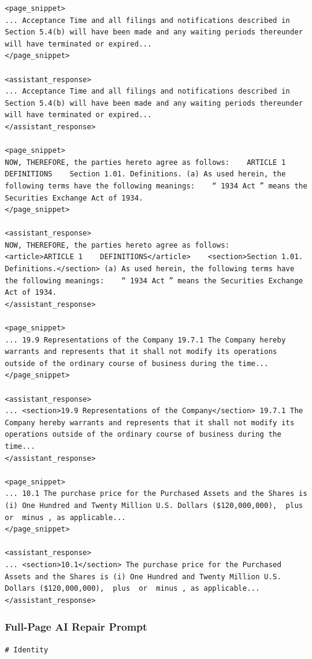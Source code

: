 \documentclass[12pt]{article}
\begin{document}
{\begin{appendices}
\begin{verbatim}
<page_snippet>
... Acceptance Time and all filings and notifications described in Section 5.4(b) will have been made and any waiting periods thereunder will have terminated or expired...
</page_snippet>

<assistant_response>
... Acceptance Time and all filings and notifications described in Section 5.4(b) will have been made and any waiting periods thereunder will have terminated or expired...
</assistant_response>

<page_snippet>
NOW, THEREFORE, the parties hereto agree as follows:    ARTICLE 1    DEFINITIONS    Section 1.01. Definitions. (a) As used herein, the following terms have the following meanings:    “ 1934 Act ” means the Securities Exchange Act of 1934.
</page_snippet>

<assistant_response>
NOW, THEREFORE, the parties hereto agree as follows:    <article>ARTICLE 1    DEFINITIONS</article>    <section>Section 1.01. Definitions.</section> (a) As used herein, the following terms have the following meanings:    “ 1934 Act ” means the Securities Exchange Act of 1934.
</assistant_response>

<page_snippet>
... 19.9 Representations of the Company 19.7.1 The Company hereby warrants and represents that it shall not modify its operations outside of the ordinary course of business during the time...
</page_snippet>

<assistant_response>
... <section>19.9 Representations of the Company</section> 19.7.1 The Company hereby warrants and represents that it shall not modify its operations outside of the ordinary course of business during the time...
</assistant_response>

<page_snippet>
... 10.1 The purchase price for the Purchased Assets and the Shares is (i) One Hundred and Twenty Million U.S. Dollars ($120,000,000),  plus  or  minus , as applicable...
</page_snippet>

<assistant_response>
... <section>10.1</section> The purchase price for the Purchased Assets and the Shares is (i) One Hundred and Twenty Million U.S. Dollars ($120,000,000),  plus  or  minus , as applicable...
</assistant_response>
\end{verbatim}
\endgroup

\subsubsection{Full-Page AI Repair Prompt}
\label{app:ai-repair-prompt}
\begingroup
\singlespacing
\begin{verbatim}
# Identity


\end{verbatim}
\end{appendices}}
\end{document}
